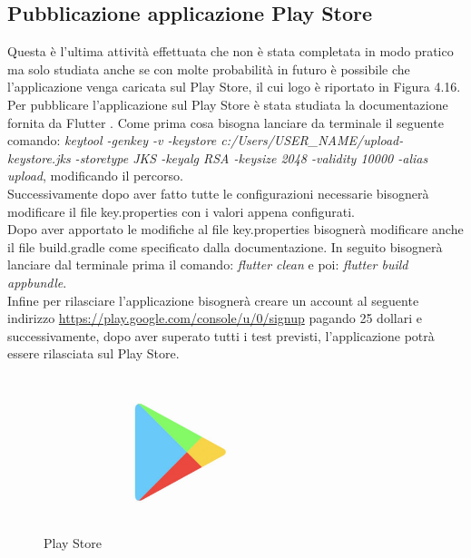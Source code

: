 \subsection{Pubblicazione applicazione Play Store}
Questa è l'ultima attività effettuata che non è stata completata in modo pratico ma solo studiata anche se con molte probabilità in futuro è possibile che l'applicazione venga caricata sul Play Store, il cui logo è riportato in Figura 4.16.\\
Per pubblicare l'applicazione sul Play Store è stata studiata la documentazione fornita da Flutter \cite{pubbps}.
Come prima cosa bisogna lanciare da terminale il seguente comando: \textit{keytool -genkey -v -keystore c:/Users/USER\_NAME/upload-keystore.jks -storetype JKS -keyalg RSA -keysize 2048 -validity 10000 -alias upload}, modificando il percorso.\\
Successivamente dopo aver fatto tutte le configurazioni necessarie bisognerà modificare il file key.properties con i valori appena configurati.\\
Dopo aver apportato le modifiche al file key.properties bisognerà modificare anche il file build.gradle come specificato dalla documentazione.
In seguito bisognerà lanciare dal terminale prima il comando: \textit{flutter clean} e poi: \textit{flutter build appbundle}.\\
Infine per rilasciare l'applicazione bisognerà creare un account al seguente indirizzo \url{https://play.google.com/console/u/0/signup} pagando 25 dollari e successivamente, dopo aver superato tutti i test previsti, l'applicazione potrà essere rilasciata sul Play Store.\\

\begin{figure}[htbp]	
	\centering
	\includegraphics[width=8cm]{immagini/playstore.jpg}
	\caption{Play Store}
	\label{fig:Play Store}
\end{figure}

